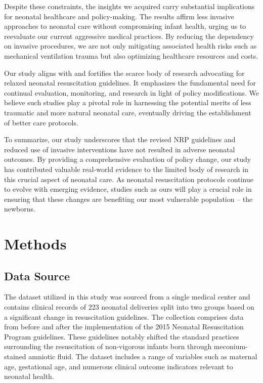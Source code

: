 \documentclass[11pt]{article}
\begin{document}
Despite these constraints, the insights we acquired carry substantial implications for neonatal healthcare and policy-making. The results affirm less invasive approaches to neonatal care without compromising infant health, urging us to reevaluate our current aggressive medical practices. By reducing the dependency on invasive procedures, we are not only mitigating associated health risks such as mechanical ventilation trauma but also optimizing healthcare resources and costs.

Our study aligns with and fortifies the scarce body of research advocating for relaxed neonatal resuscitation guidelines. It emphasizes the fundamental need for continual evaluation, monitoring, and research in light of policy modifications. We believe such studies play a pivotal role in harnessing the potential merits of less traumatic and more natural neonatal care, eventually driving the establishment of better care protocols.

To summarize, our study underscores that the revised NRP guidelines and reduced use of invasive interventions have not resulted in adverse neonatal outcomes. By providing a comprehensive evaluation of policy change, our study has contributed valuable real-world evidence to the limited body of research in this crucial aspect of neonatal care. As neonatal resuscitation protocols continue to evolve with emerging evidence, studies such as ours will play a crucial role in ensuring that these changes are benefiting our most vulnerable population – the newborns.

\section*{Methods}

\subsection*{Data Source}
The dataset utilized in this study was sourced from a single medical center and contains clinical records of 223 neonatal deliveries split into two groups based on a significant change in resuscitation guidelines. The collection comprises data from before and after the implementation of the 2015 Neonatal Resuscitation Program guidelines. These guidelines notably shifted the standard practices surrounding the resuscitation of non-vigorous infants born through meconium-stained amniotic fluid. The dataset includes a range of variables such as maternal age, gestational age, and numerous clinical outcome indicators relevant to neonatal health.
\end{document}
